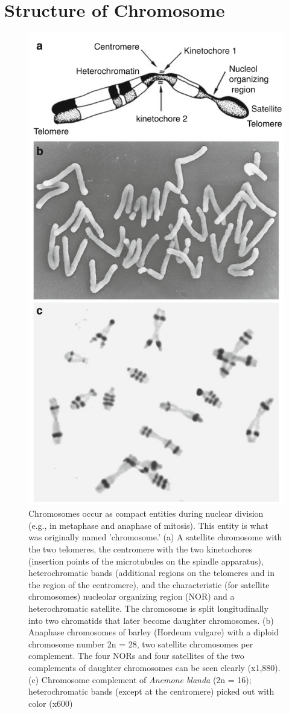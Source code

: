 \documentclass[11pt,ignorenonframetext,aspectratio=169]{beamer}
\begin{document}
\hypertarget{structure-of-chromosome}{%
\section{Structure of Chromosome}\label{structure-of-chromosome}}

\begin{frame}{}
\protect\hypertarget{section-1}{}
\begin{figure}
\includegraphics[width=0.25\linewidth]{../images/chromosome_structure} \caption{Chromosomes occur as compact entities during nuclear division (e.g., in metaphase and anaphase of mitosis). This entity is what was originally named 'chromosome.' (a) A satellite chromosome with the two telomeres, the centromere with the two kinetochores (insertion points of the microtubules on the spindle apparatus), heterochromatic bands (additional regions on the telomeres and in the region of the centromere), and the characteristic (for satellite chromosomes) nucleolar organizing region (NOR) and a heterochromatic satellite. The chromosome is split longitudinally into two chromatids that later become daughter chromosomes. (b) Anaphase chromosomes of barley (Hordeum vulgare) with a diploid chromosome number 2n = 28, two satellite chromosomes per complement. The four NORs and four satellites of the two complements of daughter chromosomes can be seen clearly (x1,880). (c) Chromosome complement of \textit{Anemone blanda} (2n = 16); heterochromatic bands (except at the centromere) picked out with color (x600)}\label{fig:chromosome-structure}
\end{figure}
\end{frame}
\end{document}
